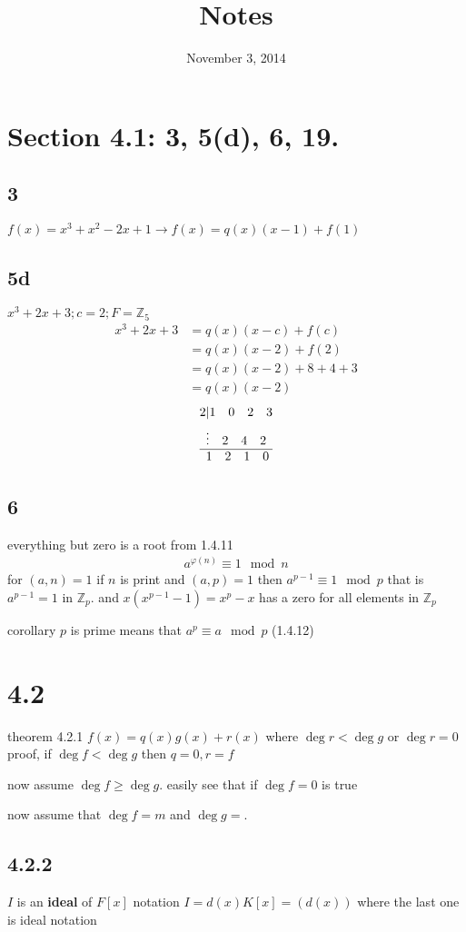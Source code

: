 \documentclass[letterpaper]{article}
\begin{document}
\title{Notes}
\date{November 3, 2014}
\maketitle
\section*{Section 4.1: 3, 5(d), 6, 19.}
\subsection*{3}
$f(x)=x^{3}+x^2-2x+1\to f(x)=q(x)(x-1)+f(1)$
\subsection*{5d}
$x^3+2x+3;c=2;F=\mathbb{Z}_5$
\begin{align*}
  x^3+2x+3&=q(x)(x-c)+f(c)\\
  &=q(x)(x-2)+f(2)\\
  &=q(x)(x-2)+8+4+3\\
  &=q(x)(x-2)
\end{align*}
\begin{align*}
  2&|1\quad0\quad2\quad 3\\
  &\vdots\quad2\quad4\quad 2\\
  \hline
  &1\quad2\quad1\quad0
\end{align*}
\subsection*{6}
everything but zero is a root
from 1.4.11
\begin{align*}
  a^{\varphi(n)}\equiv1\mod n
\end{align*}
for $(a,n)=1$
if $n$ is print and $(a,p)=1$ then $a^{p-1}\equiv 1\mod p$ that is $a^{p-1}=1$ in $\mathbb{Z}_p$. and $x(x^{p-1}-1)=x^p-x$ has a zero for all elements in $\mathbb{Z}_p$

corollary $p$ is prime means that $a^p\equiv a\mod p$ (1.4.12)

\section*{4.2}
theorem 4.2.1
$f(x)=q(x)g(x)+r(x)$ where $\deg r<\deg g$ or $\deg r=0$
proof, if $\deg f<\deg g$ then $q=0, r=f$

now assume $\deg f\ge \deg g$. easily see that if $\deg f=0$ is true

now assume that $\deg f=m$ and $\deg g=$. 


\subsection*{4.2.2}
$I$ is an {\bfseries ideal} of $F[x]$
notation $I=d(x)K[x]=(d(x))$ where the last one is ideal notation
\end{document}
